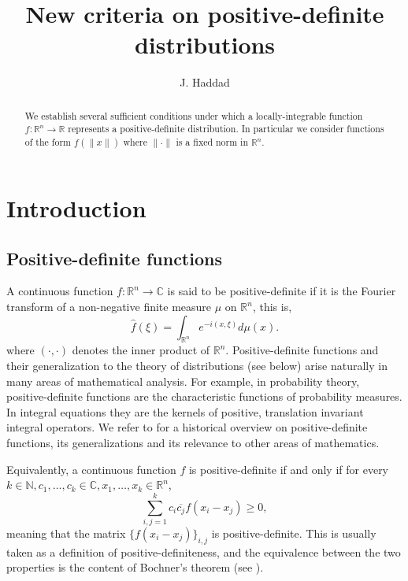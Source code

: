 \documentclass{amsart}
\title{New criteria on positive-definite distributions}
\author{J. Haddad}
\def \R {\mathbb R}
\def \C {\mathbb C}
\def \N {\mathbb N}
\begin{document}
\maketitle
\begin{abstract}
	We establish several sufficient conditions under which a locally-integrable function $f:\R^n \to \R$ represents a positive-definite distribution.
	In particular we consider functions of the form $f(\|x\|)$ where $\|\cdot\|$ is a fixed norm in $\R^n$.
\end{abstract}


\section{Introduction}

\subsection{Positive-definite functions}
A continuous function $f:\R^n \to \C$ is said to be positive-definite if it is the Fourier transform of a non-negative finite measure $\mu$ on $\R^n$, this is,
	\begin{equation}
		\label{def_fourier}
		\hat f(\xi) = \int_{\R^n} e^{-i (x, \xi) } d \mu(x).
	\end{equation}
	where $(\cdot, \cdot)$ denotes the inner product of $\R^n$.
Positive-definite functions and their generalization to the theory of distributions (see below) arise naturally in many areas of mathematical analysis.
For example, in probability theory, positive-definite functions are the characteristic functions of probability measures.
In integral equations they are the kernels of positive, translation invariant integral operators.
We refer to \cite{stewart1976positive} for a historical overview on positive-definite functions, its generalizations and its relevance to other areas of mathematics.

Equivalently, a continuous function $f$ is positive-definite if and only if for every $k \in \N, c_1, \ldots, c_k \in \C, x_1, \ldots, x_k \in \R^n$,
\begin{equation}
	\label{def_matrix}
	\sum_{i,j=1}^k c_i \overline{c_j} f(x_i - x_j) \geq 0,
\end{equation}
meaning that the matrix $\{f(x_i - x_j)\}_{i,j}$ is positive-definite.
This is usually taken as a definition of positive-definiteness, and the equivalence between the two properties is the content of Bochner's theorem (see \cite[Theorem 2, Section 3.2]{gelfandvilenkin}).
\end{document}
